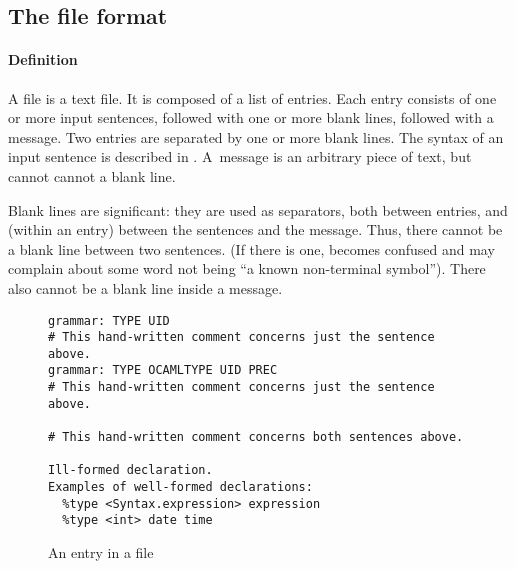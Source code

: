\documentclass[onecolumn,11pt,nocopyrightspace,preprint]{sigplanconf}
\begin{document}
\subsection{The \messages file format}
\label{sec:messages:format}

\paragraph{Definition}

A \messages file is a text file. It is composed of a list of entries. Each
entry consists of one or more input sentences, followed with one or more blank
lines, followed with a message. Two entries are separated by one or more blank
lines. The syntax of an input sentence is described in .
A~message is an arbitrary piece of text, but cannot cannot a blank line.

Blank lines are significant: they are used as separators, both between
entries, and (within an entry) between the sentences and the message. Thus,
there cannot be a blank line between two sentences. (If there is one, \menhir
becomes confused and may complain about some word not being ``a known
non-terminal symbol''). There also cannot be a blank line inside a message.

\begin{figure}
\begin{verbatim}
grammar: TYPE UID
# This hand-written comment concerns just the sentence above.
grammar: TYPE OCAMLTYPE UID PREC
# This hand-written comment concerns just the sentence above.

# This hand-written comment concerns both sentences above.

Ill-formed declaration.
Examples of well-formed declarations:
  %type <Syntax.expression> expression
  %type <int> date time
\end{verbatim}
\caption{An entry in a \messages file}
\label{fig:messages:entry}
\end{figure}
\end{document}
